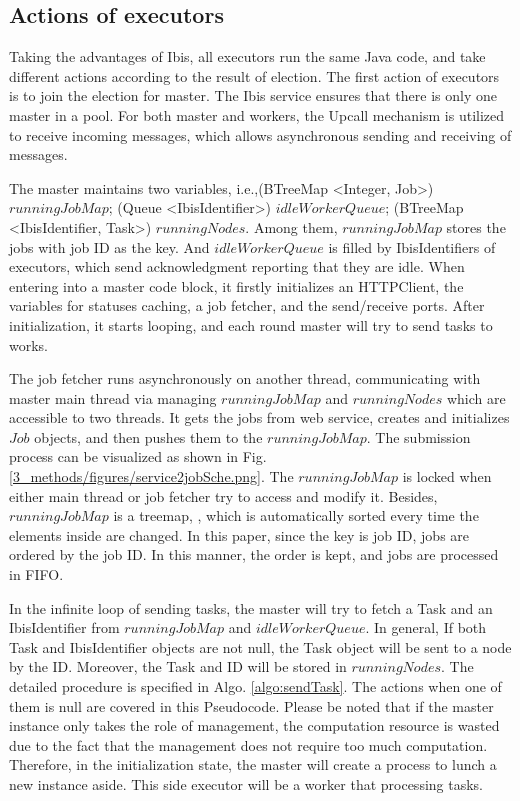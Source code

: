 \subsection{Actions of executors}
Taking the advantages of Ibis, all executors run the same Java code, and take different actions according to the result of election. 
The first action of executors is to join the election for master. 
The Ibis service ensures that there is only one master in a pool. 
For both master and workers, the Upcall mechanism is utilized to receive incoming messages, which allows asynchronous sending and receiving of messages.

The master maintains two variables, i.e.,(BTreeMap <Integer, Job>) $runningJobMap$; (Queue <IbisIdentifier>) $idleWorkerQueue$; (BTreeMap <IbisIdentifier, Task>) $runningNodes$.
Among them,  $runningJobMap$ stores the jobs with job ID as the key. And $idleWorkerQueue$ is filled by IbisIdentifiers of executors, which send acknowledgment reporting that they are idle.
When entering into a master code block, it firstly initializes an HTTPClient, the variables for statuses caching, a job fetcher, and the send/receive ports. 
After initialization, it starts looping, and each round master will try to send tasks to works.

The job fetcher runs asynchronously on another thread, communicating with master main thread via managing  $runningJobMap$ and $running Nodes $ which are accessible to two threads.
It gets the jobs from web service, creates and initializes $Job$ objects, and then pushes them to the $runningJobMap$. The submission process can be visualized as shown in Fig. \ref{3_methods/figures/service2jobSche.png}.
The $runningJobMap$ is locked when either  main thread or job fetcher try to access and modify it.
Besides, $runningJobMap$ is a treemap, , which is automatically sorted every time the elements inside are changed. 
In this paper,  since the key is job ID, jobs are ordered by the job ID. 
In this manner, the order is kept, and jobs are processed in FIFO.

In the infinite loop of sending tasks, the master will try to fetch a Task and an IbisIdentifier from $runningJobMap$ and $idleWorkerQueue$.
In general, If both Task and IbisIdentifier objects are not null, the Task object will be sent to a node by the ID. Moreover, the Task and ID will be stored in $runningNodes$. 
The detailed procedure is specified in Algo. \ref{algo:sendTask}. The actions when one of them is null are covered in this Pseudocode.
Please be noted that if the master instance only takes the role of management, the computation resource is wasted due to the fact that the management does not require too much computation. 
Therefore, in the initialization state, the master will create a process to lunch a new instance aside. 
This side executor will be a worker that processing tasks.


